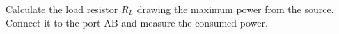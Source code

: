 \documentclass[11pt]{article}
\begin{document}
\begin{question}
    \begin{subquestion}{Calculate the load resistor $R_L$ drawing the maximum power from the source. Connect it to the port AB and measure the consumed power.}
\end{subquestion}
\end{question}
\end{document}
